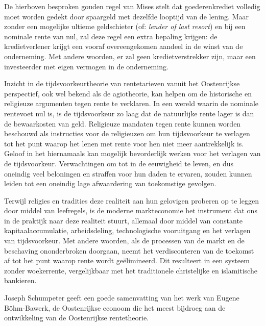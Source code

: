 \documentclass[
  a5paper,
  smalldemyvopaper,11pt,twoside,onecolumn,openright,extrafontsizes,
hidelinks]{memoir}
\begin{document}
De hierboven besproken gouden regel van Mises stelt dat goederenkrediet
volledig moet worden gedekt door spaargeld met dezelfde looptijd van de
lening. Maar zonder een mogelijke ultieme geldschieter (of: \emph{lender
of last resort}) en bij een nominale rente van nul, zal deze regel een
extra bepaling krijgen: de kredietverlener krijgt een vooraf
overeengekomen aandeel in de winst van de onderneming. Met andere
woorden, er zal geen kredietverstrekker zijn, maar een investeerder met
eigen vermogen in de onderneming.

Inzicht in de tijdsvoorkeurtheorie van rentetarieven vanuit het
Oostenrijkse perspectief, ook wel bekend als de agiotheorie, kan helpen
om de historische en religieuze argumenten tegen rente te verklaren. In
een wereld waarin de nominale rentevoet nul is, is de tijdsvoorkeur zo
laag dat de natuurlijke rente lager is dan de bewaarkosten van geld.
Religieuze mandaten tegen rente kunnen worden beschouwd als instructies
voor de religieuzen om hun tijdsvoorkeur te verlagen tot het punt waarop
het lenen met rente voor hen niet meer aantrekkelijk is. Geloof in het
hiernamaals kan mogelijk bevorderlijk werken voor het verlagen van de
tijdsvoorkeur. Verwachtingen om tot in de eeuwigheid te leven, en dus
oneindig veel beloningen en straffen voor hun daden te ervaren, zouden
kunnen leiden tot een oneindig lage afwaardering van toekomstige
gevolgen.

Terwijl religies en tradities deze realiteit aan hun gelovigen proberen
op te leggen door middel van leefregels, is de moderne markteconomie het
instrument dat ons in de praktijk naar deze realiteit stuurt, allemaal
door middel van constante kapitaalaccumulatie, arbeidsdeling,
technologische vooruitgang en het verlagen van tijdsvoorkeur. Met andere
woorden, als de processen van de markt en de beschaving ononderbroken
doorgaan, neemt het verdisconteren van de toekomst af tot het punt
waarop rente wordt geëlimineerd. Dit resulteert in een systeem zonder
woekerrente, vergelijkbaar met het traditionele christelijke en
islamitische bankieren.

Joseph Schumpeter geeft een goede samenvatting van het werk van Eugene
Böhm-Bawerk, de Oostenrijkse econoom die het meest bijdroeg aan de
ontwikkeling van de Oostenrijkse rentetheorie.
\end{document}

